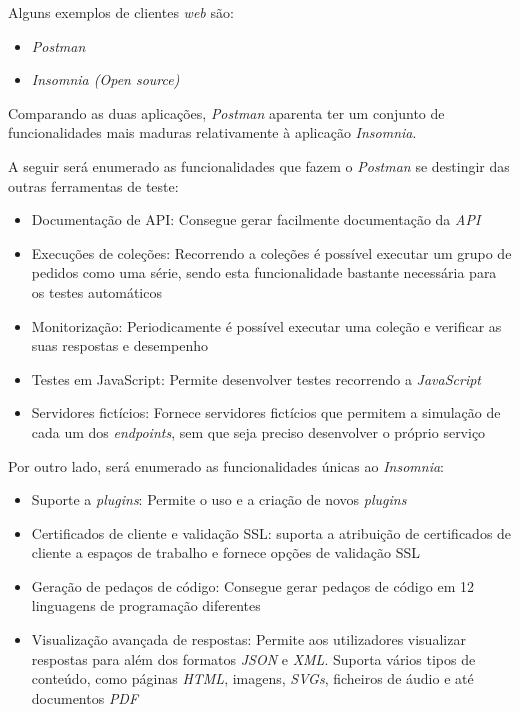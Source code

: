 Alguns exemplos de clientes \textit{web} são:
\begin{itemize}
    \item \textit{Postman} \cite{postaman}
    \item \textit{Insomnia (Open source)} \cite{insomnia}
\end{itemize}

Comparando as duas aplicações, \textit{Postman} aparenta ter um conjunto de funcionalidades mais maduras relativamente à aplicação \textit{Insomnia}.


A seguir será enumerado as funcionalidades que fazem o \textit{Postman} se destingir das outras ferramentas de teste: 

\begin{itemize}
    \item Documentação de API: Consegue gerar facilmente documentação da \textit{API} \cite{postmanvsInsomnia}
    \item Execuções de coleções: Recorrendo a coleções é possível executar um grupo de pedidos como uma série, sendo esta funcionalidade bastante necessária para os testes automáticos \cite{postmanvsInsomnia}
    \item Monitorização: Periodicamente é possível executar uma coleção e verificar as suas respostas e desempenho \cite{postmanvsInsomnia}
    \item Testes em JavaScript: Permite desenvolver testes recorrendo a \textit{JavaScript} \cite{postmanvsInsomnia}
    \item Servidores fictícios: Fornece servidores fictícios que permitem a simulação de cada um dos \textit{endpoints}, sem que seja preciso desenvolver o próprio serviço \cite{postmanvsInsomnia}
\end{itemize}

Por outro lado, será enumerado as funcionalidades únicas ao \textit{Insomnia}:

\begin{itemize}
    \item Suporte a \textit{plugins}: Permite o uso e a criação de novos \textit{plugins} \cite{postmanvsInsomnia}
    \item Certificados de cliente e validação SSL: suporta a atribuição de certificados de cliente a espaços de trabalho e fornece opções de validação SSL \cite{postmanvsInsomnia}
    \item Geração de pedaços de código: Consegue gerar pedaços de código em 12 linguagens de programação diferentes \cite{postmanvsInsomnia}
    \item Visualização avançada de respostas: Permite aos utilizadores visualizar respostas para além dos formatos \textit{JSON} e \textit{XML}. Suporta vários tipos de conteúdo, como páginas \textit{HTML}, imagens, \textit{SVGs}, ficheiros de áudio e até documentos \textit{PDF} \cite{postmanvsInsomnia}
\end{itemize}


